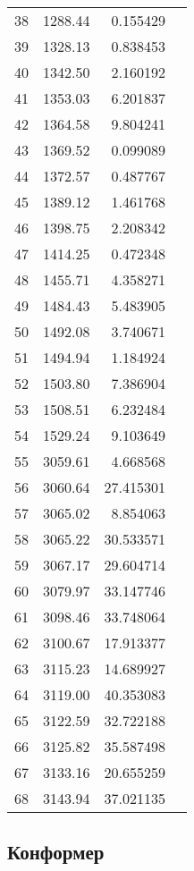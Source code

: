 \begin{tabular}{r|rr|l}
  38 &     1288.44  &  0.155429  & \\
  39 &     1328.13  &  0.838453  & \\
  40 &     1342.50  &  2.160192  & \\
  41 &     1353.03  &  6.201837  & \\
  42 &     1364.58  &  9.804241  & \\
  43 &     1369.52  &  0.099089  & \\
  44 &     1372.57  &  0.487767  & \\
  45 &     1389.12  &  1.461768  & \\
  46 &     1398.75  &  2.208342  & \\
  47 &     1414.25  &  0.472348  & \\
  48 &     1455.71  &  4.358271  & \\
  49 &     1484.43  &  5.483905  & \\
  50 &     1492.08  &  3.740671  & \\
  51 &     1494.94  &  1.184924  & \\
  52 &     1503.80  &  7.386904  & \\
  53 &     1508.51  &  6.232484  & \\
  54 &     1529.24  &  9.103649  & \\
  55 &     3059.61  &  4.668568  & \\
  56 &     3060.64  & 27.415301  & \\
  57 &     3065.02  &  8.854063  & \\
  58 &     3065.22  & 30.533571  & \\
  59 &     3067.17  & 29.604714  & \\
  60 &     3079.97  & 33.147746  & \\
  61 &     3098.46  & 33.748064  & \\
  62 &     3100.67  & 17.913377  & \\
  63 &     3115.23  & 14.689927  & \\
  64 &     3119.00  & 40.353083  & \\
  65 &     3122.59  & 32.722188  & \\
  66 &     3125.82  & 35.587498  & \\
  67 &     3133.16  & 20.655259  & \\
  68 &     3143.94  & 37.021135  & \\
  \bottomrule
\end{tabular}

\subsection{Конформер \CC{}}

